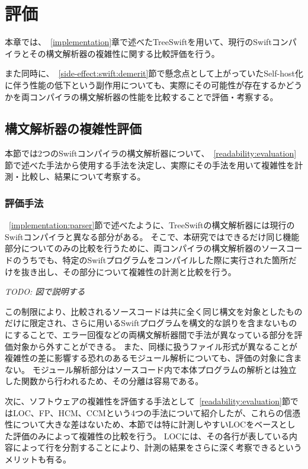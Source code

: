 \chapter{評価}
\label{evaluation}

本章では、~\ref{implementation}章で述べたTreeSwiftを用いて、現行のSwiftコンパイラとその構文解析器の複雑性に関する比較評価を行う。

また同時に、~\ref{side-effect:swift:demerit}節で懸念点として上がっていたSelf-host化に伴う性能の低下という副作用についても、実際にその可能性が存在するかどうかを両コンパイラの構文解析器の性能を比較することで評価・考察する。

\section{構文解析器の複雑性評価}
\label{evaluation:complexity}

本節では2つのSwiftコンパイラの構文解析器について、~\ref{readability:evaluation}節で述べた手法から使用する手法を決定し、実際にその手法を用いて複雑性を計測・比較し、結果について考察する。

\subsection{評価手法}
\label{evaluation:complexity:method}

~\ref{implementation:parser}節で述べたように、TreeSwiftの構文解析器には現行のSwiftコンパイラと異なる部分がある。
そこで、本研究ではできるだけ同じ機能部分についてのみの比較を行うために、両コンパイラの構文解析器のソースコードのうちでも、特定のSwiftプログラムをコンパイルした際に実行された箇所だけを抜き出し、その部分について複雑性の計測と比較を行う。

\vspace{2em}
{\sl\small{TODO: 図で説明する}}
\vspace{2em}

この制限により、比較されるソースコードは共に全く同じ構文を対象としたものだけに限定され、さらに用いるSwiftプログラムを構文的な誤りを含まないものにすることで、エラー回復などの両構文解析器間で手法が異なっている部分を評価対象から外すことができる。
また、同様に扱うファイル形式が異なることが複雑性の差に影響する恐れのあるモジュール解析についても、評価の対象に含まない。
モジュール解析部分はソースコード内で本体プログラムの解析とは独立した関数から行われるため、その分離は容易である。

次に、ソフトウェアの複雑性を評価する手法として~\ref{readability:evaluation}節ではLOC、FP、HCM、CCMという4つの手法について紹介したが、これらの信憑性について大きな差はないため、本節では特に計測しやすいLOCをベースとした評価のみによって複雑性の比較を行う。
LOCには、その各行が表している内容によって行を分割することにより、計測の結果をさらに深く考察できるというメリットも有る。

